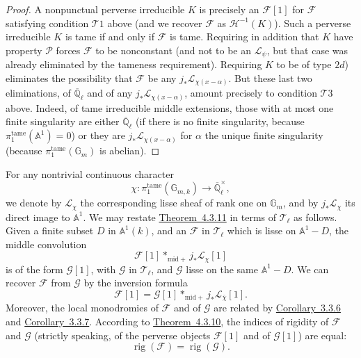 \begin{proof}
A nonpunctual perverse irreducible \(K\) is precisely an \(\mathcal{F}[1]\) for
\(\mathcal{F}\) satisfying condition \(\mathcal{T}1\) above (and we recover
\(\mathcal{F}\) as \(\mathcal{H}^{-1}(K)\)). Such a perverse irreducible \(K\)
is tame if and only if \(\mathcal{F}\) is tame. Requiring in addition that
\(K\) have property \(\mathcal{P}\) forces \(\mathcal{F}\) to be nonconstant
(and not to be an \(\mathcal{L}_\psi\), but that case was already eliminated by
the tameness requirement). Requiring \(K\) to be of type \(2d\)) eliminates the
possibility that \(\mathcal{F}\) be any
\(j_*\mathcal{L}_{\chi(x-\alpha)}\). But these last two eliminations, of
\(\overline{\mathbb{Q}}_\ell\) and of any
\(j_*\mathcal{L}_{\chi(x-\alpha)}\), amount precisely to condition
\(\mathcal{T}3\) above. Indeed, of tame irreducible middle extensions, those
with at most one finite singularity are either \(\overline{\mathbb{Q}}_\ell\)
(if there is no finite singularity, because
\(\pi_1^{\mathrm{tame}}(\mathbb{A}^1)=0\)) or they are
\(j_*\mathcal{L}_{\chi(x-\alpha)}\) for \(\alpha\) the unique finite
singularity (because \(\pi_1^{\mathrm{tame}}(\mathbb{G}_m)\) is abelian).
\end{proof}

For any nontrivial continuous character
\[
  \chi:\pi_1^{\mathrm{tame}}(\mathbb{G}_{m,k})\to
  \overline{\mathbb{Q}}_\ell^\times,
\]
we denote by \(\mathcal{L}_\chi\) the corresponding lisse sheaf of rank one on
\(\mathbb{G}_m\), and by \(j_*\mathcal{L}_\chi\) its direct image to
\(\mathbb{A}^1\). We may restate \hyperref[thm:4.3.11]{Theorem~4.3.11} in
terms of \(\mathcal{T}_\ell\) as follows. Given a finite subset \(D\) in
\(\mathbb{A}^1(k)\), and an \(\mathcal{F}\) in \(\mathcal{T}_\ell\) which is
lisse on \(\mathbb{A}^1-D\), the middle convolution
\[
  \mathcal{F}[1]*_{\mathrm{mid}+}j_*\mathcal{L}_\chi[1]
\]
is of the form \(\mathcal{G}[1]\), with \(\mathcal{G}\) in
\(\mathcal{T}_\ell\), and \(\mathcal{G}\) lisse on the same
\(\mathbb{A}^1-D\). We can recover \(\mathcal{F}\) from \(\mathcal{G}\) by the
inversion formula
\[
  \mathcal{F}[1]=\mathcal{G}[1]*_{\mathrm{mid}+}j_*\mathcal{L}_{\bar{\chi}}[1].
\]
Moreover, the local monodromies of \(\mathcal{F}\) and of \(\mathcal{G}\) are
related by \hyperref[cor:3.3.6]{Corollary~3.3.6} and
\hyperref[cor:3.3.7]{Corollary~3.3.7}. According to
\hyperref[thm:4.3.10]{Theorem~4.3.10}, the indices of rigidity of
\(\mathcal{F}\) and \(\mathcal{G}\) (strictly speaking, of the perverse objects
\(\mathcal{F}[1]\) and of \(\mathcal{G}[1]\)) are equal:
\[
  \operatorname{rig}(\mathcal{F})=\operatorname{rig}(\mathcal{G}).
\]

